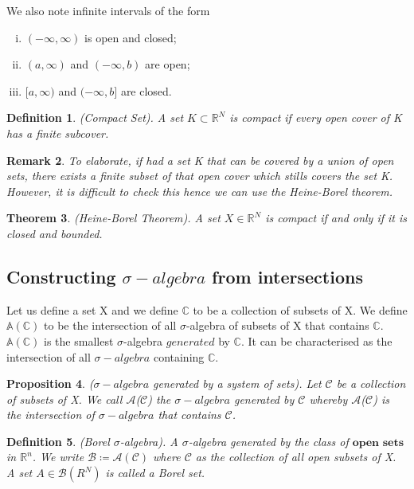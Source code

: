 \documentclass[twoside]{article}
\newcounter{lecnum}
\newtheorem{theorem}{Theorem}[lecnum]
\newtheorem{proposition}[theorem]{Proposition}
\newtheorem{remark}[theorem]{Remark}
\newtheorem{definition}[theorem]{Definition}
\newcommand{\sa}{\sigma-algebra}
\begin{document}
We also note infinite intervals of the form
\begin{enumerate}[(i)]
  \item $(-\infty, \infty)$ is open and closed;
  \item $(a, \infty)$ and $(-\infty,b)$ are open;
  \item $[a, \infty)$ and $(-\infty,b]$ are closed.
\end{enumerate}

\begin{definition}
(Compact Set). A set $K \subset \mathbb{R}^N$ is compact if every open cover of K has a finite subcover. 
\end{definition}

\begin{remark}
To elaborate, if had a set K that can be covered by a union of open sets, there exists a finite subset of that open cover which stills covers the set K. However, it is difficult to check this hence we can use the Heine-Borel theorem.
\end{remark}

\begin{theorem}
(Heine-Borel Theorem). A set $X \in \mathbb{R}^N$ is compact if and only if it is closed and bounded.
\end{theorem}

\subsection{Constructing $\sa$ from intersections}

Let us define a set X and we define $\mathbb{C}$ to be a collection of subsets of X. We define $\mathbb{A(\mathbb{C})}$ to be the intersection of all $\sigma$-algebra of subsets of X that contains $\mathbb{C}$. $\mathbb{A(\mathbb{C})}$ is the smallest $\sigma$-algebra $\textit{generated}$ by $\mathbb{C}$. It can be characterised as the intersection of all $\sa$ containing $\mathbb{C}$.


\begin{proposition}($\sa$ generated by a system of sets). Let $\mathcal{C}$ be a collection of subsets of X. We call $\mathcal{A}$($\mathcal{C}$) the $\sa$ generated by $\mathcal{C}$ whereby $\mathcal{A}$($\mathcal{C}$) is the intersection of $\sa$ that contains $\mathcal{C}$.
\end{proposition}

\begin{definition}
(Borel $\sigma$-algebra). A $\sigma$-algebra generated by the class of $\textbf{open sets}$ in $\mathbb{R}^n$. We write $\mathcal{B} \coloneqq \mathcal{A}(\mathcal{C})$ where $\mathcal{C}$ as the collection of all open subsets of X. A set $A \in \mathcal{B}(R^N)$ is called a Borel set.
\end{definition}
\end{document}

